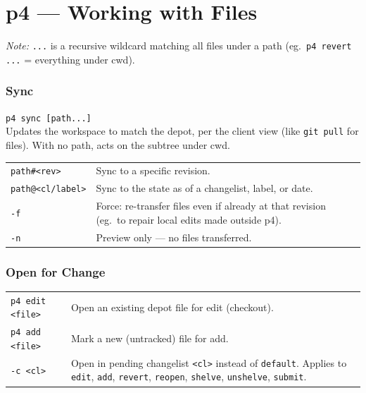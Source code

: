 \section{p4 --- Working with Files}

\textit{Note:} \texttt{...} is a recursive wildcard matching all
files under a path (eg.\ \texttt{p4 revert ...} = everything under
cwd).

\subsubsection*{Sync}

\texttt{p4 sync [path...]}\\
Updates the workspace to match the depot, per the client view
(like \texttt{git pull} for files). With no path, acts on the
subtree under cwd.

\begin{tabularx}{\linewidth}{lX}
    \texttt{path\#<rev>}     & Sync to a specific revision.\\
    \texttt{path@<cl/label>} & Sync to the state as of a
                                 changelist, label, or date.\\
\hline
    \texttt{-f} & Force: re-transfer files even if already at that
                    revision (eg.\ to repair local edits made
                    outside p4).\\
    \texttt{-n} & Preview only --- no files transferred.\\
\hline
\end{tabularx}


\subsubsection*{Open for Change}

\begin{tabularx}{\linewidth}{lX}
    \texttt{p4 edit <file>} & Open an existing depot file for edit
                                (checkout).\\
    \texttt{p4 add <file>}  & Mark a new (untracked) file for add.\\
\hline
    \texttt{-c <cl>}        & Open in pending changelist
                                \texttt{<cl>} instead of
                                \texttt{default}. Applies to
                                \texttt{edit}, \texttt{add},
                                \texttt{revert}, \texttt{reopen},
                                \texttt{shelve}, \texttt{unshelve},
                                \texttt{submit}.\\
\hline
\end{tabularx}


